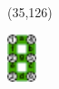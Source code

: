 \documentclass{extarticle}
\begin{document}
\begin{textblock}{0}(35,126)
\vfill
{\centerline{\includegraphics[height=14mm]{tools/images/segment-numbering.pdf}}} 
\vfill
\end{textblock}
\end{document}
